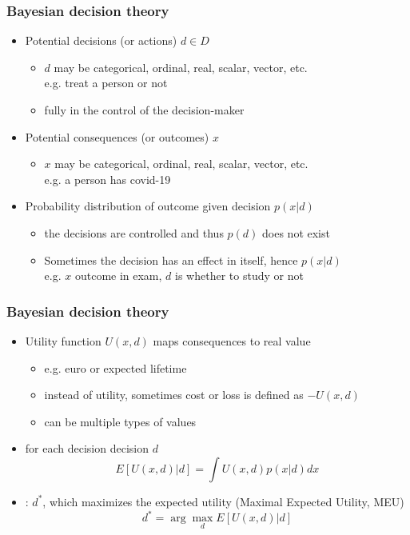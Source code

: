 \documentclass[10pt]{beamer}
\begin{document}
\begin{frame}
\frametitle{Bayesian decision theory}

  \begin{itemize}
  \item<+-> Potential decisions (or actions) $d \in D$
    \begin{itemize}
      \item $d$ may be categorical, ordinal, real, scalar, vector, etc.\\e.g. treat a person or not
      \pause
      \item fully in the control of the decision-maker
    \end{itemize}
  \pause
  \item<+-> Potential consequences (or outcomes) $x$
    \begin{itemize}
      \item $x$ may be categorical, ordinal, real, scalar, vector, etc.\\e.g. a person has covid-19
    \end{itemize}
    \pause
  \item<+-> Probability distribution of outcome given decision $p(x|d)$
    \begin{itemize}
    \item the decisions are controlled and thus $p(d)$ does not exist \pause
    \item Sometimes the decision has an effect in itself, hence $p(x|d)$\\
    e.g. $x$ outcome in exam, $d$ is whether to study or not
    \end{itemize}
  \end{itemize}

\end{frame}


\begin{frame}
\frametitle{Bayesian decision theory}

  \begin{itemize}
  \item<+->  Utility function $U(x, d)$ maps consequences to real value
    \begin{itemize}
      \item e.g. euro or expected lifetime
      \item instead of utility, sometimes cost or loss is defined as $-U(x, d)$
      \item can be multiple types of values
    \end{itemize}
  \pause
  \item {} for each decision decision $d$
  \[
  E[U(x, d)|d]=\int U(x, d) p(x|d) dx
  \]
  \pause
  \item<+-> : $d^*$, which maximizes the expected utility (Maximal Expected Utility, MEU)
    \begin{equation*}
      d^*=\arg\max_d E[U(x, d)|d]
    \end{equation*}
  \end{itemize}

\end{frame}
\end{document}
